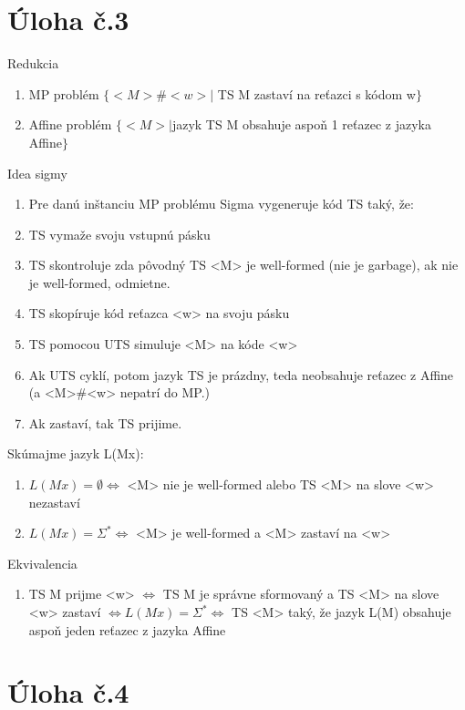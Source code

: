 \documentclass[10pt]{article}
\begin{document}
\section*{Úloha č.3}
Redukcia
\begin{enumerate}
    \item MP problém $\{<M>\#<w> |$ TS M zastaví na reťazci s kódom w$\}$
    \item Affine problém $\{<M>| $jazyk TS M obsahuje aspoň 1 reťazec z jazyka Affine$\}$
\end{enumerate}
Idea sigmy
\begin{enumerate}
    \item Pre danú inštanciu MP problému Sigma vygeneruje kód TS taký, že:
    \item TS vymaže svoju vstupnú pásku
    \item TS skontroluje zda pôvodný TS <M> je well-formed (nie je garbage), ak nie je well-formed,
        odmietne.
    \item TS skopíruje kód reťazca <w> na svoju pásku
    \item TS pomocou UTS simuluje <M> na kóde <w>
    \item Ak UTS cyklí, potom jazyk TS je prázdny, teda neobsahuje reťazec z Affine (a
        <M>\#<w> nepatrí do MP.)
    \item Ak zastaví, tak TS prijime.
\end{enumerate}
Skúmajme jazyk L(Mx):
\begin{enumerate}
    \item $L(Mx) = \emptyset \iff$ <M> nie je well-formed alebo TS <M> na slove <w> nezastaví
    \item $L(Mx) = \Sigma^* \iff$ <M> je well-formed a <M> zastaví na <w>
\end{enumerate}
Ekvivalencia
\begin{enumerate}
    \item TS M prijme <w> $\iff$ TS M je správne sformovaný a TS <M> na slove <w> zastaví $\iff L(Mx) =
        \Sigma^* \iff$ TS <M> taký, že jazyk L(M) obsahuje aspoň jeden reťazec z jazyka Affine
\end{enumerate}
\section*{Úloha č.4}
\end{document}
